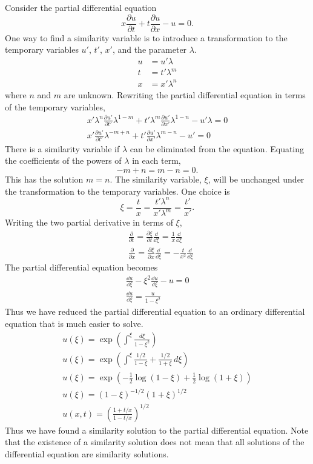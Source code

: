 \begin{Example}
  Consider the partial differential equation
  \[ x \frac{\partial u}{\partial t} + t \frac{\partial u}{\partial x} - u = 0. \]
  One way to find a similarity variable is to introduce a transformation
  to the temporary variables $u'$, $t'$, $x'$,
  and the parameter $\lambda$.
  \begin{align*}
    u &= u' \lambda \\
    t &= t' \lambda^m \\
    x &= x' \lambda^n
  \end{align*}
  where $n$ and $m$ are unknown.  Rewriting the partial differential equation in terms of the temporary
  variables,
  \begin{gather*}
    x' \lambda^n \frac{\partial u'}{\partial t'} \lambda^{1-m}
    + t' \lambda^m \frac{\partial u'}{\partial x'} \lambda^{1-n}
    - u' \lambda = 0 \\
    x' \frac{\partial u'}{\partial t'} \lambda^{-m+n} + t' \frac{\partial u'}{\partial x'} \lambda^{m-n}
    - u' = 0
  \end{gather*}
  There is a similarity variable if $\lambda$ can be eliminated from the
  equation.  Equating the coefficients of the powers of $\lambda$ in each term,
  \[-m+n = m-n = 0. \]
  This has the solution $m =n$.  The similarity variable, $\xi$,
  will be unchanged under the transformation to the temporary variables.
  One choice is
  \[ \xi = \frac{t}{x} = \frac{t' \lambda^n}{x' \lambda^m} = \frac{t'}{x'}.\]
  Writing the two partial derivative in terms of $\xi$,
  \begin{align*}
    &\frac{\partial}{\partial t} = \frac{\partial \xi}{\partial t} \frac{\dd}{\dd \xi} = \frac{1}{x} \frac{\dd}{\dd \xi}\\
    &\frac{\partial}{\partial x} = \frac{\partial \xi}{\partial x} \frac{\dd}{\dd \xi} =
    - \frac{t}{x^2} \frac{\dd}{\dd \xi}
  \end{align*}
  The partial differential equation becomes
  \begin{gather*}
    \frac{\dd u}{\dd \xi} - \xi^2 \frac{\dd u}{\dd \xi} - u = 0 \\
    \frac{\dd u}{\dd \xi} = \frac{u}{1-\xi^2}
  \end{gather*}
  Thus we have reduced the partial differential equation to an ordinary differential equation that is
  much easier to solve.
  \begin{gather*}
    u(\xi) = \exp\left(\int^\xi \frac{d\xi}{1-\xi^2} \right) \\
    u(\xi) = \exp\left(\int^\xi \frac{1/2}{1-\xi} + \frac{1/2}{1+\xi}
      \,d\xi\right) \\
    u(\xi) = \exp\left( -\frac{1}{2}\log(1-\xi) + \frac{1}{2}\log(1+\xi)\right) \\
    u(\xi) = (1-\xi)^{-1/2} (1+\xi)^{1/2} \\
    u(x,t) = \left( \frac{1+t/x}{1-t/x} \right)^{1/2}
  \end{gather*}
  Thus we have found a similarity solution to the partial differential
  equation.  Note that the existence of a similarity solution does not
  mean that all solutions of the differential equation are similarity
  solutions.



\end{Example}
